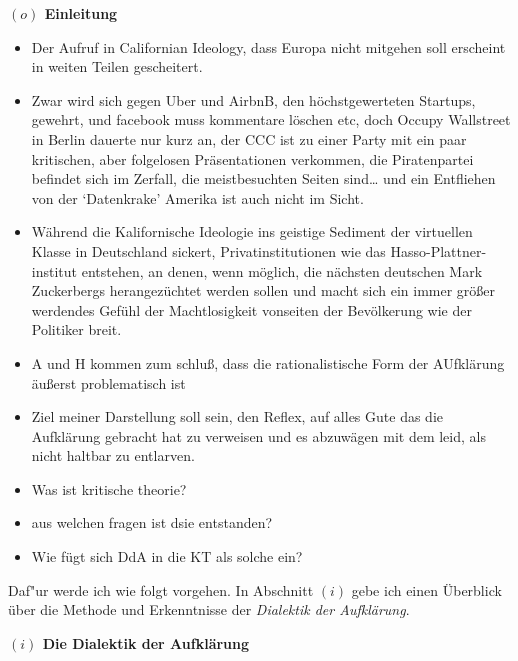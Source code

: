 \documentclass[a4paper, 12pt]{article}
\begin{document}
\begin{onehalfspace} 

\noindent\textbf{$(o)$ Einleitung}

\noindent %

\begin{itemize}
  \item Der Aufruf in Californian Ideology, dass Europa nicht mitgehen soll erscheint in weiten Teilen gescheitert. 
  \item Zwar wird sich gegen Uber und AirbnB, den höchstgewerteten Startups, gewehrt, und facebook muss kommentare löschen etc, doch Occupy Wallstreet in Berlin dauerte nur kurz an, der CCC ist zu einer Party mit ein paar kritischen, aber folgelosen Präsentationen verkommen, die Piratenpartei befindet sich im Zerfall, die meistbesuchten Seiten sind… und ein Entfliehen von der ‘Datenkrake’ Amerika ist auch nicht im Sicht. 
\item Während die Kalifornische Ideologie ins geistige Sediment der virtuellen Klasse in Deutschland sickert, Privatinstitutionen wie das Hasso-Plattner-institut entstehen, an denen, wenn möglich, die nächsten deutschen Mark Zuckerbergs herangezüchtet werden sollen und macht sich ein immer größer werdendes Gefühl der Machtlosigkeit vonseiten der Bevölkerung wie der Politiker breit.
\item A und H kommen zum schluß, dass die rationalistische Form der AUfklärung äußerst problematisch ist
\item Ziel meiner Darstellung soll sein, den Reflex, auf alles Gute das die Aufklärung gebracht hat zu verweisen und es abzuwägen mit dem leid, als nicht haltbar zu entlarven.
   \item Was ist kritische theorie?
  \item aus welchen fragen ist dsie entstanden?
  \item Wie fügt sich DdA in die KT als solche ein?
\end{itemize}


Daf"ur werde ich wie folgt vorgehen. In Abschnitt $(i)$ gebe ich einen Überblick über die Methode und Erkenntnisse der \emph{Dialektik der Aufklärung}. 

\vspace{5mm}

\noindent\textbf{$(i)$ Die Dialektik der Aufklärung}


\end{onehalfspace}
\end{document}
